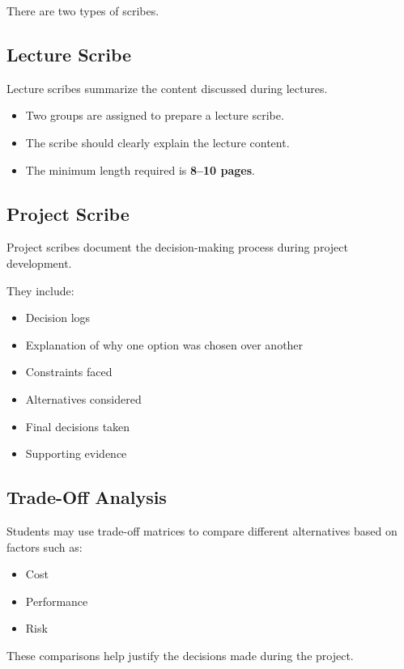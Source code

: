 \documentclass[12pt,a4paper]{article}
\begin{document}
There are two types of scribes.

\subsection{Lecture Scribe}

Lecture scribes summarize the content discussed during lectures.

\begin{itemize}
\item Two groups are assigned to prepare a lecture scribe.
\item The scribe should clearly explain the lecture content.
\item The minimum length required is \textbf{8–10 pages}.
\end{itemize}

\subsection{Project Scribe}

Project scribes document the decision-making process during project development.

They include:

\begin{itemize}
\item Decision logs
\item Explanation of why one option was chosen over another
\item Constraints faced
\item Alternatives considered
\item Final decisions taken
\item Supporting evidence
\end{itemize}

\subsection{Trade-Off Analysis}

Students may use trade-off matrices to compare different alternatives based on factors such as:

\begin{itemize}
\item Cost
\item Performance
\item Risk
\end{itemize}

These comparisons help justify the decisions made during the project.
\end{document}
